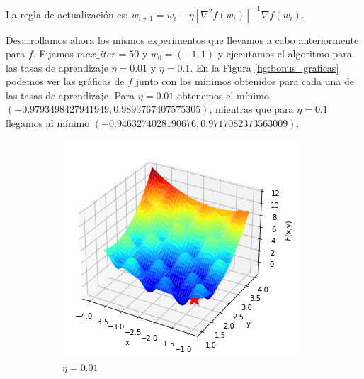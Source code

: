 \documentclass[10pt,a4paper]{article}
\begin{document}
La regla de actualización es: $w_{i+1} = w_i - \eta [\nabla^2 f(w_i)]^{-1} \nabla f(w_i)$.

Desarrollamos ahora los mismos experimentos que llevamos a cabo anteriormente para $f$. Fijamos $max\_iter = 50$ y $w_0 = (-1, 1)$ y ejecutamos el algoritmo para las tasas de aprendizaje $\eta = 0.01$ y $\eta = 0.1$. En la Figura \ref{fig:bonus_graficas} podemos ver las gráficas de $f$ junto con los mínimos obtenidos para cada una de las tasas de aprendizaje. Para $\eta = 0.01$ obtenemos el mínimo $(-0.9793498427941949, 0.9893767407575305)$, mientras que para $\eta = 0.1$ llegamos al mínimo $(-0.9463274028190676, 0.9717082373563009)$.

\begin{figure}[h]
	\begin{subfigure}{0.5\textwidth}
		\centering
		\includegraphics[width=\textwidth]{bonus_grafica_eta0.01}
		\caption{$\eta = 0.01$}
	\end{subfigure}
	\begin{subfigure}{0.5\textwidth}
		\centering

\end{subfigure}
\end{figure}
\end{document}
